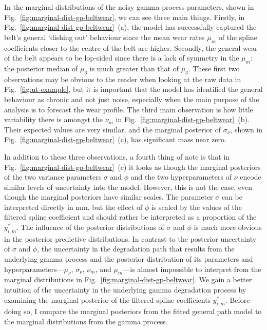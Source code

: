 In the marginal distributions of the noisy gamma process parameters, shown in Fig.~\ref{fig:marginal-dist-gp-beltwear}, we can see three main things. Firstly, in Fig.~\ref{fig:marginal-dist-gp-beltwear}~(a), the model has successfully captured the belt's general `dishing out' behaviour since the mean wear rates $\mu_m$ of the spline coefficients closer to the centre of the belt are higher. Secondly, the general wear of the belt appears to be lop-sided since there is a lack of symmetry in the $\mu_m$: the posterior median of $\mu_6$ is much greater than that of $\mu_3$. These first two observations may be obvious to the reader when looking at the raw data in Fig.~\ref{fig:ut-example}, but it is important that the model has identified the general behaviour as chronic and not just noise, especially when the main purpose of the analysis is to forecast the wear profile. The third main observation is how little variability there is amongst the $\nu_m$ in Fig.~\ref{fig:marginal-dist-gp-beltwear}~(b). Their expected values are very similar, and the marginal posterior of $\sigma_\nu$, shown in Fig.~\ref{fig:marginal-dist-gp-beltwear}~(c), has significant mass near zero. 

In addition to these three observations, a fourth thing of note is that in Fig.~\ref{fig:marginal-dist-gp-beltwear}~(c) it looks as though the marginal posteriors of the two variance parameters $\sigma$ and $\phi$ and the two hyperparameters of $\nu$ encode similar levels of uncertainty into the model. However, this is not the case, even though the marginal posteriors have similar scales. The parameter $\sigma$ can be interpreted directly in mm, but the effect of $\phi$ is scaled by the values of the filtered spline coefficient and should rather be interpreted as a proportion of the $y^*_{i,m}$. The influence of the posterior distributions of $\sigma$ and $\phi$ is much more obvious in the posterior predictive distributions. In contrast to the posterior uncertainty of $\sigma$ and $\phi$, the uncertainty in the degradation path that results from the underlying gamma process and the posterior distribution of its parameters and hyperparameters---$\mu_\nu$, $\sigma_\nu$, $\nu_m$, and $\mu_m$---is almost impossible to interpret from the marginal distributions in Fig.~\ref{fig:marginal-dist-gp-beltwear}. We gain a better intuition of the uncertainty in the underlying gamma degradation process by examining the marginal posterior of the filtered spline coefficients $y^*_{i, m}$. Before doing so, I compare the marginal posteriors from the fitted general path model to the marginal distributions from the gamma process.

